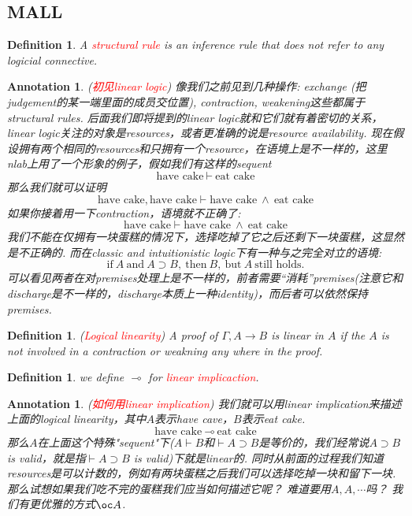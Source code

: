 \documentclass{article}
\theoremstyle{plain}
\newtheorem{definition}[theorem]{Definition}
\newtheorem{annotation}[theorem]{Annotation}
\theoremstyle{nonumberplain}
\newcommand{\redt}[1]{\textcolor{red}{#1}}
\begin{document}
\subsection{MALL}
\begin{definition}
\rm A \redt{structural rule} is an inference rule that does not refer to any \emph{logicial connective}. 
\end{definition}

\begin{annotation}
\rm (\redt{初见linear logic}) 像我们之前见到几种操作: exchange (把judgement的某一端里面的成员交位置), contraction, weakening这些都属于structural rules. 后面我们即将提到的linear logic就和它们就有着密切的关系，linear logic关注的对象是resources，或者更准确的说是resource availability. 现在假设拥有两个相同的resources和只拥有一个resource，在语境上是不一样的，这里nlab上用了一个形象的例子，假如我们有这样的sequent
\[
	\text{have cake} ~\vdash ~ \text{eat cake}
\]
那么我们就可以证明
\[
\text{have cake}, \text{have cake} \vdash \text{have cake}~\wedge ~\text{eat cake}  
\]
如果你接着用一下contraction，语境就不正确了:
\[
	\text{have cake} \vdash \text{have cake}~\wedge ~\text{eat cake}
\]
我们不能在仅拥有一块蛋糕的情况下，选择吃掉了它之后还剩下一块蛋糕，这显然是不正确的. 而在classic and intuitionistic logic下有一种与之完全对立的语境:
\[
	\text{if}~A~\text{and}~A \supset B,~\text{then}~B, ~\text{but}~A~\text{still holds}.
\]
可以看见两者在对premises处理上是不一样的，前者需要“消耗”premises(注意它和discharge是不一样的，discharge本质上一种identity)，而后者可以依然保持premises.
\end{annotation}

\begin{definition}
\rm (\redt{Logical linearity}) A proof of $\Gamma,A \to B$ is linear in $A$ if the $A$ is not involved in a contraction or weakning any where in the proof.
\end{definition}

\begin{definition}
\rm we define $\multimap$ for \redt{linear implicaction}.
\end{definition}

\begin{annotation}
\rm (\redt{如何用linear implication}) 我们就可以用linear implication来描述上面的logical linearity，其中$A$表示have cave，$B$表示eat cake. 
\[
	\text{have cake} ~\multimap ~ \text{eat cake}
\]
那么$A$在上面这个特殊"sequent"下($A \vdash B$和$\vdash A \supset B$是等价的，我们经常说$A \supset B$ is valid，就是指$\vdash A \supset B$ is valid)下就是linear的. 同时从前面的过程我们知道resources是可以计数的，例如有两块蛋糕之后我们可以选择吃掉一块和留下一块. 那么试想如果我们吃不完的蛋糕我们应当如何描述它呢？ 难道要用$A, A, \cdots$吗？ 我们有更优雅的方式$\oc A$.
\end{annotation}
\end{document}
